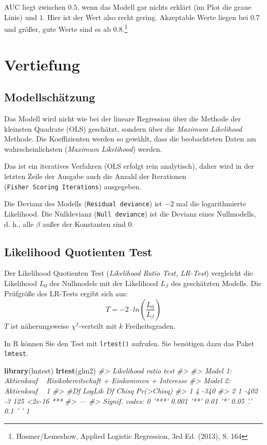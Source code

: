 \documentclass[12pt,ngerman,]{book}
\makeatletter
\newenvironment{Shaded}{\begin{snugshade}}{\end{snugshade}}
\newcommand{\KeywordTok}[1]{\textcolor[rgb]{0.13,0.29,0.53}{\textbf{{#1}}}}
\newcommand{\CommentTok}[1]{\textcolor[rgb]{0.56,0.35,0.01}{\textit{{#1}}}}
\newcommand{\NormalTok}[1]{{#1}}
\let\rmarkdownfootnote\footnote%
\def\footnote{\protect\rmarkdownfootnote}
\newenvironment{kframe}{%
\medskip{}
\setlength{\fboxsep}{.8em}
 \def\at@end@of@kframe{}%
 \ifinner\ifhmode%
  \def\at@end@of@kframe{\end{minipage}}%
  \begin{minipage}{\columnwidth}%
 \fi\fi%
 \def\FrameCommand##1{\hskip\@totalleftmargin \hskip-\fboxsep
 \colorbox{shadecolor}{##1}\hskip-\fboxsep
     \hskip-\linewidth \hskip-\@totalleftmargin \hskip\columnwidth}%
 \MakeFramed {\advance\hsize-\width
   \@totalleftmargin\z@ \linewidth\hsize
   \@setminipage}}%
 {\par\unskip\endMakeFramed%
 \at@end@of@kframe}
\renewenvironment{Shaded}{\begin{kframe}}{\end{kframe}}
\makeatother
\begin{document}
AUC liegt zwischen \(0.5\), wenn das Modell gar nichts erklärt (im Plot
die graue Linie) und \(1\). Hier ist der Wert also recht gering.
Akzeptable Werte liegen bei \(0.7\) und größer, gute Werte sind es ab
\(0.8\).\footnote{Hosmer/Lemeshow, Applied Logistic Regression, 3rd Ed.
  (2013), S. 164}

\section{Vertiefung}\label{vertiefung-1}

\subsection{Modellschätzung}\label{modellschatzung}

Das Modell wird nicht wie bei der lineare Regression über die Methode
der kleinsten Quadrate (OLS) geschätzt, sondern über die \emph{Maximum
Likelihood} Methode. Die Koeffizienten werden so gewählt, dass die
beobachteten Daten am wahrscheinlichsten (\emph{Maximum Likelihood})
werden.

Das ist ein iteratives Verfahren (OLS erfolgt rein analytisch), daher
wird in der letzten Zeile der Ausgabe auch die Anzahl der Iterationen
(\texttt{Fisher\ Scoring\ Iterations}) ausgegeben.

Die Devianz des Modells (\texttt{Residual\ deviance}) ist \(-2\) mal die
logarithmierte Likelihood. Die Nulldevianz (\texttt{Null\ deviance}) ist
die Devianz eines Nullmodells, d. h., alle \(\beta\) außer der
Konstanten sind 0.

\subsection{Likelihood Quotienten
Test}\label{likelihood-quotienten-test}

Der Likelihood Quotienten Test (\emph{Likelihood Ratio Test, LR-Test})
vergleicht die Likelihood \(L_0\) des Nullmodels mit der Likelihood
\(L_{\beta}\) des geschätzten Modells. Die Prüfgröße des LR-Tests ergibt
sich aus: \[{T=-2\cdot ln\left( \frac{L_0}{L_{\beta}}\right)}\] \(T\)
ist näherungsweise \(\chi ^2\)-verteilt mit \(k\) Freiheitsgraden.

In R können Sie den Test mit \texttt{lrtest()} aufrufen. Sie benötigen
dazu das Paket \texttt{lmtest}.

\begin{Shaded}
\begin{Highlighting}[]
\KeywordTok{library}\NormalTok{(lmtest)}
\KeywordTok{lrtest}\NormalTok{(glm2)}
\CommentTok{#> Likelihood ratio test}
\CommentTok{#> }
\CommentTok{#> Model 1: Aktienkauf ~ Risikobereitschaft + Einkommen + Interesse}
\CommentTok{#> Model 2: Aktienkauf ~ 1}
\CommentTok{#>   #Df LogLik Df Chisq Pr(>Chisq)    }
\CommentTok{#> 1   4   -340                        }
\CommentTok{#> 2   1   -402 -3   125     <2e-16 ***}
\CommentTok{#> ---}
\CommentTok{#> Signif. codes:  0 '***' 0.001 '**' 0.01 '*' 0.05 '.' 0.1 ' ' 1}
\end{Highlighting}
\end{Shaded}
\end{document}

